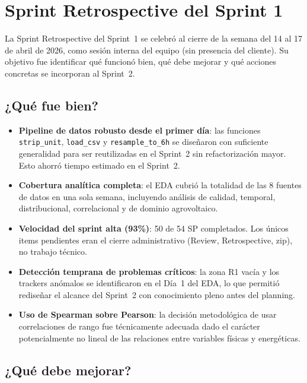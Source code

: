 \documentclass[12pt,a4paper]{article}
\begin{document}
\section{Sprint Retrospective del Sprint 1}
\label{sec:retro_s1}

La Sprint Retrospective del Sprint~1 se celebró al cierre de la semana del 14 al 17 de abril de 2026, como sesión interna del equipo (sin presencia del cliente). Su objetivo fue identificar qué funcionó bien, qué debe mejorar y qué acciones concretas se incorporan al Sprint~2.

\subsection{¿Qué fue bien?}

\begin{itemize}
  \item \textbf{Pipeline de datos robusto desde el primer día}: las funciones \texttt{strip\_unit}, \texttt{load\_csv} y \texttt{resample\_to\_6h} se diseñaron con suficiente generalidad para ser reutilizadas en el Sprint~2 sin refactorización mayor. Esto ahorró tiempo estimado en el Sprint~2.
  \item \textbf{Cobertura analítica completa}: el EDA cubrió la totalidad de las 8 fuentes de datos en una sola semana, incluyendo análisis de calidad, temporal, distribucional, correlacional y de dominio agrovoltaico.
  \item \textbf{Velocidad del sprint alta (93\%)}: 50 de 54 SP completados. Los únicos items pendientes eran el cierre administrativo (Review, Retrospective, zip), no trabajo técnico.
  \item \textbf{Detección temprana de problemas críticos}: la zona R1 vacía y los trackers anómalos se identificaron en el Día~1 del EDA, lo que permitió rediseñar el alcance del Sprint~2 con conocimiento pleno antes del planning.
  \item \textbf{Uso de Spearman sobre Pearson}: la decisión metodológica de usar correlaciones de rango fue técnicamente adecuada dado el carácter potencialmente no lineal de las relaciones entre variables físicas y energéticas.
\end{itemize}

\subsection{¿Qué debe mejorar?}
\end{document}
